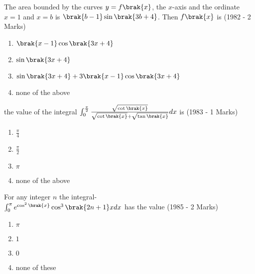 	\item The area bounded by the curves $y=f\brak{x}$, the $x$-axis and the ordinate $x=1$ and $x=b$ is $\brak{b-1} \sin \brak{3b+4}$. Then $f\brak{x}$ is
		\hfill{(1982 - 2 Marks)}
	                \begin{enumerate}
			\item$\brak{x-1} \cos \brak{3x+4}$
			\item$\sin {\brak{3x+4}}$
			\item$\sin {\brak{3x+4}+3\brak{x-1} \cos {\brak{3x+4}}}$
			\item none of the above
		        \end{enumerate}
	\item the value of the integral $\int_0^{\frac{\pi}{2}} \frac{\sqrt{\cot\brak{x}}}{\sqrt{\cot\brak{x}}+\sqrt{\tan\brak{x}}}dx$ is 
\hfill{(1983 - 1 Marks)}
	                \begin{enumerate}
				\item $\frac{\pi}{4}$
				\item$\frac{\pi}{2}$
				\item$\pi$
				\item none of the above
		         \end{enumerate}
	\item For any integer $n$ the integral-\\
		$\int_0^{\pi} e^{\cos^2 \brak{x}} \cos ^3 {\brak{2n+1}}xdx$ has the value
                     	\hfill{(1985 - 2 Marks)}   
			\begin{enumerate}
				\item	$\pi$
				\item $1$
				\item $0$
				\item none of these
			  \end{enumerate}
	

